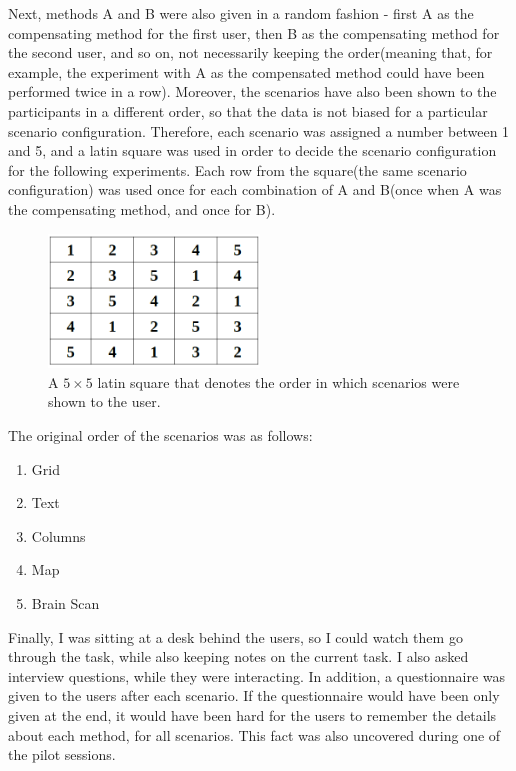 \documentclass[]{article}
\begin{document}
Next, methods A and B were also given in a random fashion - first A as the compensating method for the first user, then B as the compensating method for the second user, and so on, not necessarily keeping the order(meaning that, for example, the experiment with A as the compensated method could have been performed twice in a row). Moreover, the scenarios have also been shown to the participants in a different order, so that the data is not biased for a particular scenario configuration. Therefore, each scenario was assigned a number between 1 and 5, and a latin square was used in order to decide the scenario configuration for the following experiments. Each row from the square(the same scenario configuration) was used once for each combination of A and B(once when A was the compensating method, and once for B).

\begin{figure}[!hbtp]
    \centering
    \includegraphics[width=0.5\textwidth]{figures/LatinSquare5x5.PNG}
    \caption{A $5 \times 5$ latin square that denotes the order in which scenarios were shown to the user.}
    \label{fig:LatinSquare}
\end{figure}

The original order of the scenarios was as follows:
\begin{enumerate}
\item Grid
\item Text
\item Columns
\item Map
\item Brain Scan
\end{enumerate}


Finally, I was sitting at a desk behind the users, so I could watch them go through the task, while also keeping notes on the current task. I also asked interview questions, while they were interacting. In addition, a questionnaire was given to the users after each scenario. If the questionnaire would have been only given at the end, it would have been hard for the users to remember the details about each method, for all scenarios. This fact was also uncovered during one of the pilot sessions.
\end{document}
